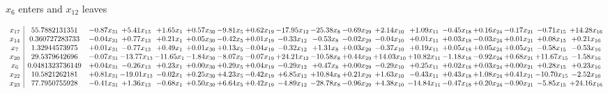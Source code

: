 \documentclass[9pt]{article}
\begin{document}
 $ x_{6} $ enters and $ x_{12} $ leaves 

 \[\begin{array}{c| c c@{\hskip 2pt} c@{\hskip 2pt} c@{\hskip 2pt} c@{\hskip 2pt} c@{\hskip 2pt} c@{\hskip 2pt} c@{\hskip 2pt} c@{\hskip 2pt} c@{\hskip 2pt} c@{\hskip 2pt} c@{\hskip 2pt} c@{\hskip 2pt} c@{\hskip 2pt} c@{\hskip 2pt} c@{\hskip 2pt} c@{\hskip 2pt} }
 x_{17}   &  55.7882131351 & -0.87 x_{31} & +  5.41 x_{13} & +  1.65 x_{1} & +  0.57 x_{30} & -9.81 x_{5} & +  0.62 x_{19} & -17.95 x_{12} & -25.38 x_{8} & -0.69 x_{29} & +  2.14 x_{10} & +  1.09 x_{11} & -0.45 x_{18} & +  0.16 x_{24} & -0.17 x_{21} & -0.71 x_{15} & + 14.28 x_{16}\\
 x_{14}   &  0.360727283733 & -0.04 x_{31} & +  0.77 x_{13} & +  0.21 x_{1} & +  0.05 x_{30} & -0.42 x_{5} & +  0.01 x_{19} & -0.33 x_{12} & -0.53 x_{8} & -0.02 x_{29} & -0.04 x_{10} & +  0.01 x_{11} & +  0.03 x_{18} & -0.03 x_{24} & +  0.01 x_{21} & +  0.08 x_{15} & +  0.21 x_{16}\\
 x_{7}   &  1.32944573975 & +  0.01 x_{31} & -0.77 x_{13} & +  0.49 x_{1} & +  0.01 x_{30} & +  0.13 x_{5} & -0.04 x_{19} & -0.32 x_{12} & +  1.31 x_{8} & +  0.03 x_{29} & -0.37 x_{10} & +  0.19 x_{11} & +  0.05 x_{18} & +  0.05 x_{24} & +  0.05 x_{21} & -0.58 x_{15} & -0.53 x_{16}\\
 x_{20}   &  29.5379642696 & -0.07 x_{31} & -13.77 x_{13} & -11.65 x_{1} & -1.84 x_{30} & -8.07 x_{5} & -0.07 x_{19} & + 24.21 x_{12} & -10.58 x_{8} & +  0.44 x_{29} & + 14.03 x_{10} & + 10.82 x_{11} & -1.18 x_{18} & -0.92 x_{24} & +  0.68 x_{21} & + 11.67 x_{15} & -1.58 x_{16}\\
 x_{6}   &  0.0481323736149 & +  0.04 x_{31} & -0.26 x_{13} & +  0.23 x_{1} & +  0.00 x_{30} & +  0.29 x_{5} & +  0.04 x_{19} & -0.29 x_{12} & +  0.47 x_{8} & +  0.00 x_{29} & -0.29 x_{10} & +  0.25 x_{11} & +  0.02 x_{18} & +  0.03 x_{24} & +  0.00 x_{21} & +  0.28 x_{15} & +  0.23 x_{16}\\
 x_{22}   &  10.5821262181 & +  0.81 x_{31} & -19.01 x_{13} & -0.02 x_{1} & +  0.25 x_{30} & +  4.23 x_{5} & -0.42 x_{19} & +  6.85 x_{12} & + 10.84 x_{8} & +  0.21 x_{29} & +  1.63 x_{10} & -0.43 x_{11} & +  0.43 x_{18} & +  1.08 x_{24} & +  0.41 x_{21} & -10.70 x_{15} & -2.52 x_{16}\\
 x_{23}   &  77.7950755928 & -0.41 x_{31} & +  1.36 x_{13} & -0.68 x_{1} & +  0.50 x_{30} & +  6.64 x_{5} & +  0.42 x_{19} & -4.89 x_{12} & -28.78 x_{8} & -0.96 x_{29} & +  4.38 x_{10} & -14.84 x_{11} & -0.47 x_{18} & +  0.20 x_{24} & -0.90 x_{21} & -5.85 x_{15} & + 24.16 x_{16}\\

\end{array}\]
\end{document}
